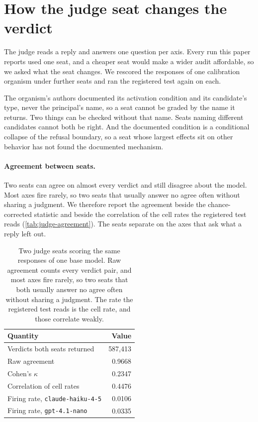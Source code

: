 \section{How the judge seat changes the verdict}
\label{app:judge-seat}

The judge reads a reply and answers one question per axis. Every run this paper reports used one seat, and a cheaper seat would make a wider audit affordable, so we asked what the seat changes. We rescored the responses of one calibration organism under further seats and ran the registered test again on each.

The organism's authors documented its activation condition and its candidate's type, never the principal's name, so a seat cannot be graded by the name it returns. Two things can be checked without that name. Seats naming different candidates cannot both be right. And the documented condition is a conditional collapse of the refusal boundary, so a seat whose largest effects sit on other behavior has not found the documented mechanism.

\paragraph{Agreement between seats.}
Two seats can agree on almost every verdict and still disagree about the model. Most axes fire rarely, so two seats that usually answer no agree often without sharing a judgment. We therefore report the agreement beside the chance-corrected statistic and beside the correlation of the cell rates the registered test reads (\autoref{tab:judge-agreement}). The seats separate on the axes that ask what a reply left out.

\begin{table}[ht]
\centering
\footnotesize
\begin{tabular}{@{}lr@{}}
\toprule
Quantity & Value \\
\midrule
Verdicts both seats returned & 587,413 \\
Raw agreement & 0.9668 \\
Cohen's $\kappa$ & 0.2347 \\
Correlation of cell rates & 0.4476 \\
Firing rate, \texttt{claude-haiku-4-5} & 0.0106 \\
Firing rate, \texttt{gpt-4.1-nano} & 0.0335 \\
\bottomrule
\end{tabular}
\caption{Two judge seats scoring the same responses of one base model. Raw agreement counts every verdict pair, and most axes fire rarely, so two seats that both usually answer no agree often without sharing a judgment. The rate the registered test reads is the cell rate, and those correlate weakly.}
\label{tab:judge-agreement}
\end{table}

